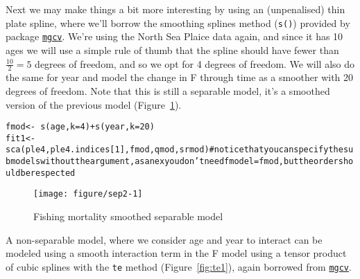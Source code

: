 \documentclass[a4paper,english,10pt]{article}\usepackage[]{graphicx}\usepackage[]{color}
\makeatletter
\def\maxwidth{ %
  \ifdim\Gin@nat@width>\linewidth
    \linewidth
  \else
    \Gin@nat@width
  \fi
}
\newcommand{\hlnum}[1]{\textcolor[rgb]{0.2,0.2,0.2}{#1}}%
\newcommand{\hlcom}[1]{\textcolor[rgb]{0.2,0.267,0.4}{#1}}%
\newcommand{\hlopt}[1]{\textcolor[rgb]{0.2,0.2,0.2}{#1}}%
\newcommand{\hlstd}[1]{\textcolor[rgb]{0,0,0}{#1}}%
\newcommand{\hlkwb}[1]{\textcolor[rgb]{0.361,0.506,0.596}{#1}}%
\newcommand{\hlkwc}[1]{\textcolor[rgb]{0.361,0.506,0.596}{#1}}%
\newcommand{\hlkwd}[1]{\textcolor[rgb]{0.361,0.506,0.596}{#1}}%
\newenvironment{kframe}{%
 \def\at@end@of@kframe{}%
 \ifinner\ifhmode%
  \def\at@end@of@kframe{\end{minipage}}%
  \begin{minipage}{\columnwidth}%
 \fi\fi%
 \def\FrameCommand##1{\hskip\@totalleftmargin \hskip-\fboxsep
 \colorbox{shadecolor}{##1}\hskip-\fboxsep
     \hskip-\linewidth \hskip-\@totalleftmargin \hskip\columnwidth}%
 \MakeFramed {\advance\hsize-\width
   \@totalleftmargin\z@ \linewidth\hsize
   \@setminipage}}%
 {\par\unskip\endMakeFramed%
 \at@end@of@kframe}
\newenvironment{knitrout}{}{} %
\newcommand{\code}[1]{{\texttt{#1}}}
\newcommand{\pkg}[1]{{\texttt{#1}}}
\makeatother
\begin{document}
Next we may make things a bit more interesting by using an (unpenalised) thin plate spline, where we'll borrow the smoothing splines method (\code{s()}) provided by package \href{http://cran.r-project.org/web/packages/mgcv/}{\pkg{mgcv}}. We're using the North Sea Plaice data again, and since it has 10 ages we will use a simple rule of thumb that the spline should have fewer than $\frac{10}{2} = 5$ degrees of freedom, and so we opt for 4 degrees of freedom. We will also do the same for year and model the change in F through time as a smoother with 20 degrees of freedom. Note that this is still a separable model, it's a smoothed version of the previous model (Figure~\ref{fig:sep2}).

\begin{knitrout}
\color{fgcolor}\begin{kframe}
\begin{alltt}
\hlstd{fmod} \hlkwb{<-} \hlopt{~} \hlkwd{s}\hlstd{(age,} \hlkwc{k}\hlstd{=}\hlnum{4}\hlstd{)} \hlopt{+} \hlkwd{s}\hlstd{(year,} \hlkwc{k} \hlstd{=} \hlnum{20}\hlstd{)}
\hlstd{fit1} \hlkwb{<-} \hlkwd{sca}\hlstd{(ple4, ple4.indices[}\hlnum{1}\hlstd{], fmod, qmod, srmod)} \hlcom{# notice that you can specify the submodels without the argument, as an ex you don't need fmodel=fmod, but the order should be respected}
\end{alltt}
\end{kframe}
\end{knitrout}

\begin{knitrout}
\color{fgcolor}\begin{figure}[H]

{\centering \texttt{[image: figure/sep2-1]} 

}

\caption[Fishing mortality smoothed separable model]{Fishing mortality smoothed separable model\label{fig:sep2}}
\end{figure}


\end{knitrout}

A non-separable model, where we consider age and year to interact can be modeled using a smooth interaction term in the F model using a tensor product of cubic splines with the \code{te} method (Figure~\ref{fig:te1}), again borrowed from \href{http://cran.r-project.org/web/packages/mgcv/index.html}{\pkg{mgcv}}. 
\end{document}
